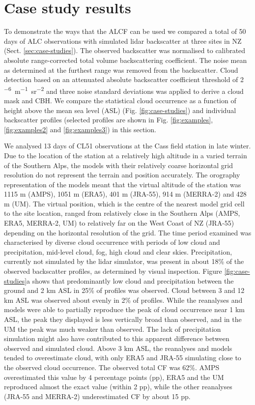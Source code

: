 \section{Case study results}
\label{sec:results}

To demonstrate the ways that the ALCF can be used we compared a total of 50 days of ALC observations with simulated lidar
backscatter at three sites in NZ (Sect. \ref{sec:case-studies}).
The observed backscatter was normalised to calibrated absolute range-corrected
total volume backscattering coefficient. The noise mean as determined at the
furthest range was removed from the backscatter. Cloud detection based on an
attenuated absolute backscatter coefficient threshold of 2 \unit{^{-6} m^{-1}sr^{-2}}
and three noise standard deviations was applied
to derive a cloud mask and CBH. We compare the statistical cloud occurrence
as a function of height above the mean sea level (ASL) (Fig.
\ref{fig:case-studies}) and individual backscatter profiles (selected
profiles are shown in Fig. \ref{fig:examples}, \ref{fig:examples2} and \ref{fig:examples3}) in this section.

We analysed 13 days of CL51 observations at the Cass field station in late
winter. Due to the location of the station at a relatively high altitude in a
varied terrain of the Southern Alps, the models with their
relatively coarse horizontal grid resolution do not represent the
terrain and position accurately. The orography representation of the models meant
that the virtual altitude of the station was 1115 m (AMPS), 1051 m (ERA5),
401 m (JRA-55), 914 m (MERRA-2) and  428 m (UM). The virtual position, which is the centre
of the nearest model grid cell to the site location, ranged from relatively
close in the Southern Alps (AMPS, ERA5, MERRA-2, UM) to relatively far on the West
Coast of NZ (JRA-55) depending on the horizontal resolution of the grid. The time period examined was characterised by diverse cloud
occurrence with periods of low cloud and precipitation, mid-level cloud,
fog, high cloud and clear skies. Precipitation, currently not simulated by the
lidar simulator, was present in about 18\% of the observed backscatter profiles,
as determined by visual inspection.
Figure \ref{fig:case-studies}a shows that predominantly low cloud and
precipitation between the ground and 2 km ASL in 25\% of
profiles was observed. Cloud between 3 and 12 km ASL was observed about
evenly in 2\% of profiles. While the reanalyses and models were able to partially
reproduce the peak of cloud occurrence near 1 km ASL, the peak they displayed is less vertically broad than observed,
and in the UM the peak was much weaker than observed.
The lack of precipitation simulation
might also have contributed to this apparent difference between observed and simulated
cloud. Above 3 km ASL, the reanalyses and models tended to overestimate cloud,
with only ERA5 and JRA-55 simulating close to the observed cloud occurrence.
The observed total CF was 62\%. AMPS overestimated this value by 4 percentage points (pp),
ERA5 and the UM reproduced almost the exact value (within 2 pp), while the other reanalyses (JRA-55 and MERRA-2)
underestimated CF by about 15 pp.

